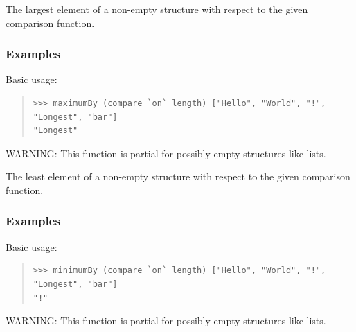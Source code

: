 \begin{haddockdesc}
\item[\begin{tabular}{@{}l}
maximumBy :: Foldable t => (a -> a -> Ordering) -> t a -> a
\end{tabular}]
{\haddockbegindoc
The largest element of a non-empty structure with respect to the
 given comparison function.\par
\subsubsection*{\textbf{Examples}}
Basic usage:\par
\begin{quote}
{\haddockverb\begin{verbatim}
>>> maximumBy (compare `on` length) ["Hello", "World", "!", "Longest", "bar"]
"Longest"

\end{verbatim}}
\end{quote}
WARNING: This function is partial for possibly-empty structures like lists.\par}
\end{haddockdesc}
\begin{haddockdesc}
\item[\begin{tabular}{@{}l}
minimumBy :: Foldable t => (a -> a -> Ordering) -> t a -> a
\end{tabular}]
{\haddockbegindoc
The least element of a non-empty structure with respect to the
 given comparison function.\par
\subsubsection*{\textbf{Examples}}
Basic usage:\par
\begin{quote}
{\haddockverb\begin{verbatim}
>>> minimumBy (compare `on` length) ["Hello", "World", "!", "Longest", "bar"]
"!"

\end{verbatim}}
\end{quote}
WARNING: This function is partial for possibly-empty structures like lists.\par}
\end{haddockdesc}
